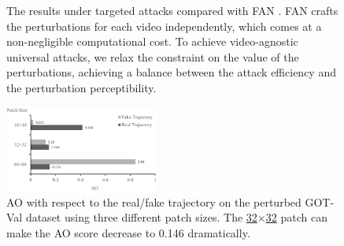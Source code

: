 \documentclass[journal]{IEEEtran}
\begin{document}
\begin{figure}[t]
  \centering
  \vspace{-1mm}
  \caption{The results under targeted attacks compared with FAN \cite{FAN}.  FAN crafts the perturbations for each video independently, which comes at a non-negligible computational cost. To achieve video-agnostic universal attacks, we relax the constraint on the value of the perturbations, achieving a balance between the attack efficiency and the perturbation perceptibility.}
  \label{fig:vis_fan}
  \vspace{-4mm}
\end{figure}
\begin{figure}[t!]
  \begin{center}
    \includegraphics[width=0.45\textwidth]{images_imperceptible/patch_size/patch_size.png}
  \end{center}
  \caption{AO with respect to the real/fake trajectory on the perturbed GOT-Val dataset using three different patch sizes. The \uline{32$\times$32} patch can make the AO score decrease to 0.146 dramatically.}
  \label{fig:patch_size_table}
\end{figure}
\end{document}

